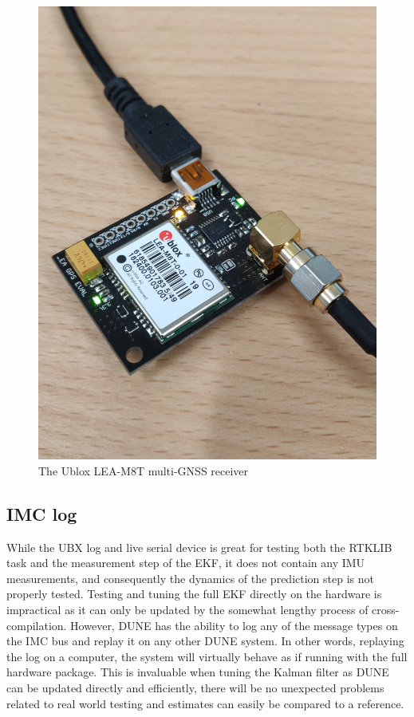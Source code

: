         \begin{figure}[!htbp]
            \centering
            \includegraphics[scale=0.05]{Implementation/Images/lea-m8t.jpg}
            \caption{The Ublox LEA-M8T multi-GNSS receiver}
            \label{fig:lea-m8t}
        \end{figure}
        
    \subsection{IMC log}
        While the UBX log and live serial device is great for testing both the RTKLIB task and the measurement step of the EKF, it does not contain any IMU measurements, and consequently the dynamics of the prediction step is not properly tested. Testing and tuning the full EKF directly on the hardware is impractical as it can only be updated by the somewhat lengthy process of cross-compilation. However, DUNE has the ability to log any of the message types on the IMC bus and replay it on any other DUNE system. In other words, replaying the log on a computer, the system will virtually behave as if running with the full hardware package. This is invaluable when tuning the Kalman filter as DUNE can be updated directly and efficiently, there will be no unexpected problems related to real world testing and estimates can easily be compared to a reference.